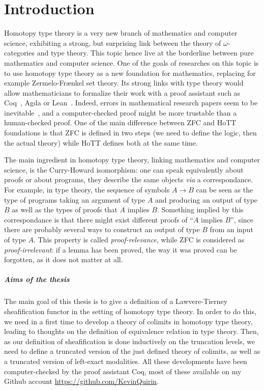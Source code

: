 \chapter{Introduction}
\label{chap:intro}

Homotopy type theory is a very new branch of mathematics and computer
science, exhibiting a strong, but surprising link between the theory
of $\omega$-categories and type theory. This topic hence live at the
borderline between pure mathematics and computer science. One of the
goals of researches on this topic is to use homotopy type theory as a
new foundation for mathematics, replacing for example Zermelo-Frænkel
set theory. Its strong links with type theory would allow
mathematicians to formalize their work with a proof assistant such as
Coq~\cite{coq:refman:8.4}, Agda\cite{norell2007towards} or
Lean~\cite{lean}. Indeed, errors in mathematical research papers seem
to be inevitable~\cite{vv-univ-f}, and a computer-checked proof might
be more trustable than a human-checked proof. One of the main
difference between ZFC and HoTT foundations is that ZFC is defined in
two steps (we need to define the logic, then the actual theory) while
HoTT defines both at the same time.

The main ingredient in homotopy type theory, linking mathematics and
computer science, is the Curry-Howard isomorphism: one can speak
equivalently about proofs or about programs, they describe the same
objects {\em via} a correspondance. For example, in type theory, the
sequence of symbols $A\to B$ can be seen as the type of programs
taking an argument of type $A$ and producing an output of type $B$ as
well as the types of proofs that $A$ implies $B$. Something implied by
this correspondance is that there might exist different proofs of
``$A$ implies $B$'', since there are probably several ways to
construct an output of type $B$ from an input of type $A$. This
property is called {\em proof-relevance}, while ZFC is considered as
{\em proof-irrelevant}: if a lemma has been proved, the way it was
proved can be forgotten, as it does not matter at all.


\paragraph*{Aims of the thesis}
The main goal of this thesis is to give a definition of a
Lawvere-Tierney sheafification functor in the setting of homotopy type
theory. In order to do this, we need in a first time to develop a
theory of colimits in homotopy type theory, leading to thoughts on the
definition of equivalence relation in type theory. Then, as our
definition of sheafification is done inductively on the truncation
levels, we need to define a truncated version of the just defined
theory of colimits, as well as a truncated version of left-exact
modalities. 
All these developments have been computer-checked by the proof
assistant Coq, most of these available on my Github account
\url{https://github.com/KevinQuirin}.

